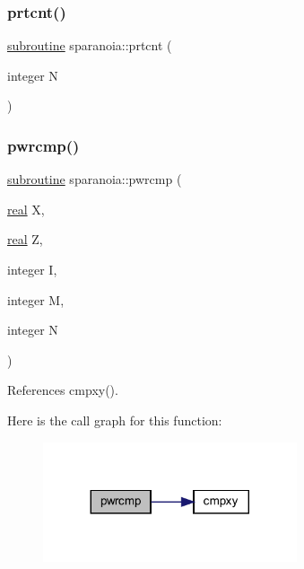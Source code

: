 \subsubsection{\texorpdfstring{prtcnt()}{prtcnt()}}
{\footnotesize\ttfamily \hyperlink{M__stopwatch_83_8txt_acfbcff50169d691ff02d4a123ed70482}{subroutine} sparanoia\+::prtcnt (\begin{DoxyParamCaption}\item[{integer}]{N }\end{DoxyParamCaption})}

\mbox{\label{sparanoia_8f90_afc3a5a8e4b6d1ff954a3b5cfa5d754e0}} 
\subsubsection{\texorpdfstring{pwrcmp()}{pwrcmp()}}
{\footnotesize\ttfamily \hyperlink{M__stopwatch_83_8txt_acfbcff50169d691ff02d4a123ed70482}{subroutine} sparanoia\+::pwrcmp (\begin{DoxyParamCaption}\item[{\hyperlink{read__watch_83_8txt_abdb62bde002f38ef75f810d3a905a823}{real}}]{X,  }\item[{\hyperlink{read__watch_83_8txt_abdb62bde002f38ef75f810d3a905a823}{real}}]{Z,  }\item[{integer}]{I,  }\item[{integer}]{M,  }\item[{integer}]{N }\end{DoxyParamCaption})}



References cmpxy().

Here is the call graph for this function\+:
\nopagebreak
\begin{figure}[H]
\begin{center}
\leavevmode
\includegraphics[width=212pt]{sparanoia_8f90_afc3a5a8e4b6d1ff954a3b5cfa5d754e0_cgraph}
\end{center}
\end{figure}
\mbox{\label{sparanoia_8f90_a91e4601692e8df990b28ad4c7f81c096}} 
